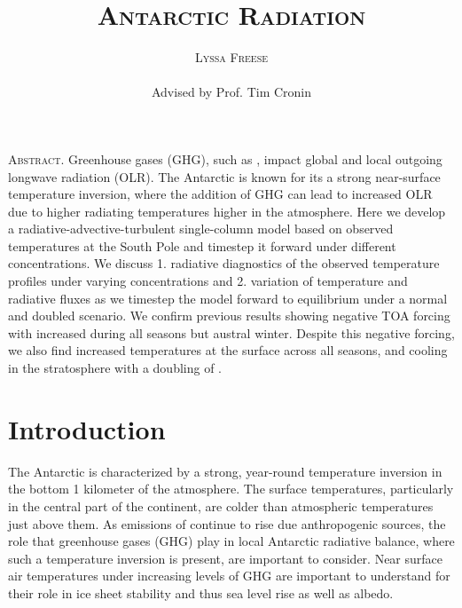 \documentclass[12]{article}
\title{{\textsc{\Large Antarctic Radiation}}}
\author{\textsc{Lyssa Freese}
\\\\
Advised by Prof. Tim Cronin}
\begin{document}
\maketitle
\thispagestyle{empty}

\setlength{\leftskip}{1.1cm}
\setlength{\rightskip}{1.1cm}


\bigskip
\bigskip

{\textsc{Abstract.} }
Greenhouse gases (GHG), such as , impact global and local outgoing longwave radiation (OLR). The Antarctic is known for its a strong near-surface temperature inversion, where the addition of GHG can lead to increased OLR due to higher radiating temperatures higher in the atmosphere. Here we develop a radiative-advective-turbulent single-column model based on observed temperatures at the South Pole and timestep it forward under different  concentrations. We discuss 1. radiative diagnostics of the observed temperature profiles under varying  concentrations and 2. variation of temperature and radiative fluxes as we timestep the model forward to equilibrium under a normal and doubled  scenario. We confirm previous results showing negative TOA forcing with increased  during all seasons but austral winter. Despite this negative forcing, we also find increased temperatures at the surface across all seasons, and cooling in the stratosphere with a doubling of .
\bigskip
\bigskip 
\clearpage
\setcounter{page}{1}

\setlength{\leftskip}{0cm}
\setlength{\rightskip}{0cm}

\section{Introduction}
The Antarctic is characterized by a strong, year-round temperature inversion in the bottom 1 kilometer of the atmosphere. The surface temperatures, particularly in the central part of the continent, are colder than atmospheric temperatures just above them\citep{hudson_look_2005}. As emissions of  continue to rise due anthropogenic sources, the role that greenhouse gases (GHG) play in local Antarctic radiative balance, where such a temperature inversion is present, are important to consider. Near surface air temperatures under increasing levels of GHG are important to understand for their role in ice sheet stability and thus sea level rise as well as albedo. 
\end{document}
